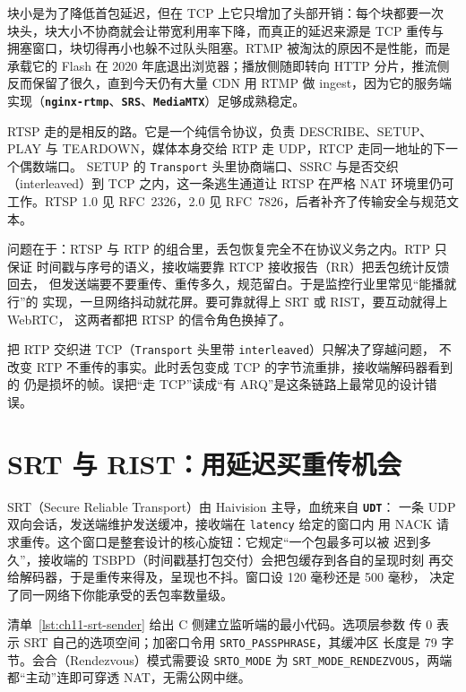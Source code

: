 \documentclass[12pt,a4paper,fontset=fandol]{ctexbook}
\newcommand{\Tp}[1]{\texttt{#1}}
\newcommand{\Lib}[1]{\textbf{\texttt{#1}}}
\newcommand{\Lang}[1]{\textsf{#1}}
\newcommand{\CL}{\Lang{C}}
\begin{document}
块小是为了降低首包延迟，但在 TCP 上它只增加了头部开销：每个块都要一次
块头，块大小不协商就会让带宽利用率下降，而真正的延迟来源是 TCP 重传与
拥塞窗口，块切得再小也躲不过队头阻塞。RTMP 被淘汰的原因不是性能，而是
承载它的 Flash 在 2020 年底退出浏览器；播放侧随即转向 HTTP 分片，推流侧
反而保留了很久，直到今天仍有大量 CDN 用 RTMP 做 ingest，因为它的服务端
实现（\Lib{nginx-rtmp}、\Lib{SRS}、\Lib{MediaMTX}）足够成熟稳定。

RTSP 走的是相反的路。它是一个纯信令协议，负责 DESCRIBE、SETUP、PLAY 与
TEARDOWN，媒体本身交给 RTP 走 UDP，RTCP 走同一地址的下一个偶数端口。
SETUP 的 \Tp{Transport} 头里协商端口、SSRC 与是否交织（interleaved）到 TCP
之内，这一条逃生通道让 RTSP 在严格 NAT 环境里仍可工作。RTSP 1.0 见
RFC~2326，2.0 见 RFC~7826，后者补齐了传输安全与规范文本。

问题在于：RTSP 与 RTP 的组合里，丢包恢复完全不在协议义务之内。RTP 只保证
时间戳与序号的语义，接收端要靠 RTCP 接收报告（RR）把丢包统计反馈回去，
但发送端要不要重传、重传多久，规范留白。于是监控行业里常见``能播就行''的
实现，一旦网络抖动就花屏。要可靠就得上 SRT 或 RIST，要互动就得上 WebRTC，
这两者都把 RTSP 的信令角色换掉了。

\begin{warning}[title={RTSP 的 TCP 交织不等于可靠传输}]
把 RTP 交织进 TCP（\Tp{Transport} 头里带 \Tp{interleaved}）只解决了穿越问题，
不改变 RTP 不重传的事实。此时丢包变成 TCP 的字节流重排，接收端解码器看到的
仍是损坏的帧。误把``走 TCP''读成``有 ARQ''是这条链路上最常见的设计错误。
\end{warning}

\section{SRT 与 RIST：用延迟买重传机会}

SRT（Secure Reliable Transport）由 Haivision 主导，血统来自 \Lib{UDT}：
一条 UDP 双向会话，发送端维护发送缓冲，接收端在 \Tp{latency} 给定的窗口内
用 NACK 请求重传。这个窗口是整套设计的核心旋钮：它规定``一个包最多可以被
迟到多久''，接收端的 TSBPD（时间戳基打包交付）会把包缓存到各自的呈现时刻
再交给解码器，于是重传来得及，呈现也不抖。窗口设 120 毫秒还是 500 毫秒，
决定了同一网络下你能承受的丢包率数量级。

清单~\ref{lst:ch11-srt-sender} 给出 \CL{} 侧建立监听端的最小代码。选项层参数
传 0 表示 SRT 自己的选项空间；加密口令用 \Tp{SRTO\_PASSPHRASE}，其缓冲区
长度是 79 字节。会合（Rendezvous）模式需要设 \Tp{SRTO\_MODE} 为
\Tp{SRT\_MODE\_RENDEZVOUS}，两端都``主动''连即可穿透 NAT，无需公网中继。
\end{document}
